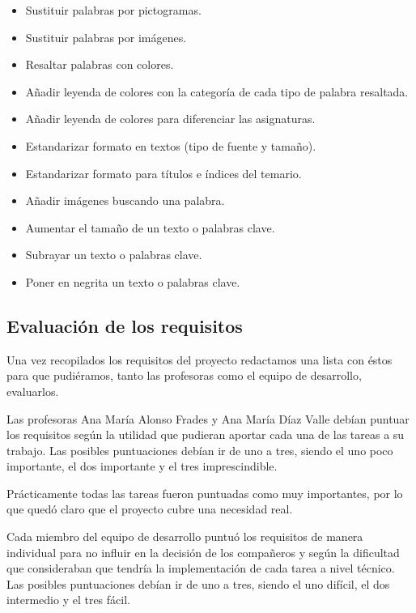 \begin{itemize}
	\item Sustituir palabras por pictogramas.
	\item Sustituir palabras por im\'agenes.
	\item Resaltar palabras con colores.
	\item A\~{n}adir leyenda de colores con la categor\'ia de cada tipo de palabra resaltada.
	\item A\~{n}adir leyenda de colores para diferenciar las asignaturas.
	\item Estandarizar formato en textos (tipo de fuente y tama\~{n}o).
	\item Estandarizar formato para t\'itulos e \'indices del temario.
	\item A\~{n}adir im\'agenes buscando una palabra.
	\item Aumentar el tama\~{n}o de un texto o palabras clave.
	\item Subrayar un texto o palabras clave.
	\item Poner en negrita un texto o palabras clave.
\end{itemize}

\subsection{Evaluaci\'on de los requisitos}

	Una vez recopilados los requisitos del proyecto redactamos una lista con \'estos para que pudi\'eramos, tanto las profesoras como el equipo de desarrollo, evaluarlos.

	Las profesoras Ana Mar\'ia Alonso Frades y Ana Mar\'ia D\'iaz Valle deb\'ian puntuar los requisitos seg\'un la utilidad que pudieran aportar cada una de las tareas a su trabajo. Las posibles puntuaciones deb\'ian ir de uno a tres, siendo el uno poco importante, el dos importante y el tres imprescindible.

	Pr\'acticamente todas las tareas fueron puntuadas como muy importantes, por lo que qued\'o claro que el proyecto cubre una necesidad real.

	Cada miembro del equipo de desarrollo puntu\'o los requisitos de manera individual para no influir en la decisi\'on de los compa\~{n}eros y seg\'un la dificultad que consideraban que tendr\'ia la implementaci\'on de cada tarea a nivel t\'ecnico. Las posibles puntuaciones deb\'ian ir de uno a tres, siendo el uno dif\'icil, el dos intermedio y el tres f\'acil.

